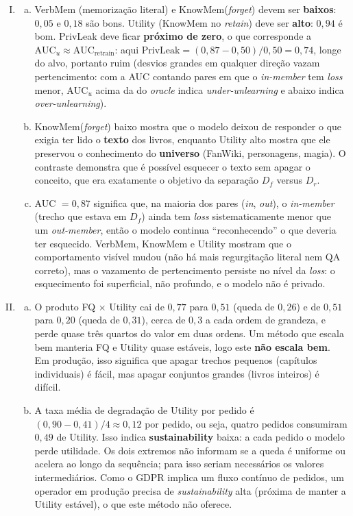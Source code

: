 \documentclass{dlproblemset}
\begin{document}
\begin{enumerate}[I)]
    \item
    \begin{enumerate}[(a)]
        \item VerbMem (memorização literal) e KnowMem(\textit{forget}) devem ser \textbf{baixos}: $0{,}05$ e $0{,}18$ são bons. Utility (KnowMem no \textit{retain}) deve ser \textbf{alto}: $0{,}94$ é bom. PrivLeak deve ficar \textbf{próximo de zero}, o que corresponde a $\mathrm{AUC}_u \approx \mathrm{AUC}_{\text{retrain}}$: aqui $\text{PrivLeak} = (0{,}87 - 0{,}50)/0{,}50 = 0{,}74$, longe do alvo, portanto ruim (desvios grandes em qualquer direção vazam pertencimento: com a AUC contando pares em que o \textit{in-member} tem \textit{loss} menor, $\mathrm{AUC}_u$ acima da do \textit{oracle} indica \textit{under-unlearning} e abaixo indica \textit{over-unlearning}).
        \item KnowMem(\textit{forget}) baixo mostra que o modelo deixou de responder o que exigia ter lido o \textbf{texto} dos livros, enquanto Utility alto mostra que ele preservou o conhecimento do \textbf{universo} (FanWiki, personagens, magia). O contraste demonstra que é possível esquecer o texto sem apagar o conceito, que era exatamente o objetivo da separação $D_f$ versus $D_r$.
        \item AUC $= 0{,}87$ significa que, na maioria dos pares (\textit{in}, \textit{out}), o \textit{in-member} (trecho que estava em $D_f$) ainda tem \textit{loss} sistematicamente menor que um \textit{out-member}, então o modelo continua ``reconhecendo'' o que deveria ter esquecido. VerbMem, KnowMem e Utility mostram que o comportamento visível mudou (não há mais regurgitação literal nem QA correto), mas o vazamento de pertencimento persiste no nível da \textit{loss}: o esquecimento foi superficial, não profundo, e o modelo não é privado.
    \end{enumerate}

    \item
    \begin{enumerate}[(a)]
        \item O produto FQ $\times$ Utility cai de $0{,}77$ para $0{,}51$ (queda de $0{,}26$) e de $0{,}51$ para $0{,}20$ (queda de $0{,}31$), cerca de $0{,}3$ a cada ordem de grandeza, e perde quase três quartos do valor em duas ordens. Um método que escala bem manteria FQ e Utility quase estáveis, logo este \textbf{não escala bem}. Em produção, isso significa que apagar trechos pequenos (capítulos individuais) é fácil, mas apagar conjuntos grandes (livros inteiros) é difícil.
        \item A taxa média de degradação de Utility por pedido é $(0{,}90 - 0{,}41)/4 \approx 0{,}12$ por pedido, ou seja, quatro pedidos consumiram $0{,}49$ de Utility. Isso indica \textbf{sustainability} baixa: a cada pedido o modelo perde utilidade. Os dois extremos não informam se a queda é uniforme ou acelera ao longo da sequência; para isso seriam necessários os valores intermediários. Como o GDPR implica um fluxo contínuo de pedidos, um operador em produção precisa de \textit{sustainability} alta (próxima de manter a Utility estável), o que este método não oferece.
    \end{enumerate}


\end{enumerate}
\end{document}
